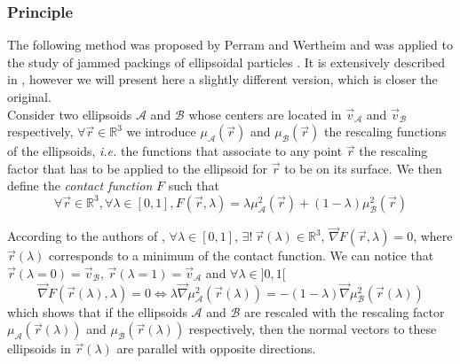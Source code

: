\documentclass[class=report, float=false, crop=false]{standalone}
\begin{document}
\subsubsection{Principle}

The following method was proposed by Perram and Wertheim \cite{perram1985statistical} and was applied to the study of jammed packings of ellipsoidal particles \cite{donev2007underconstrained}. It is extensively described in \cite{donev}, however we will present here a slightly different version, which is closer the original.\\

Consider two ellipsoids $\mathcal{A}$ and $\mathcal{B}$ whose centers are located in $\vec{v}_{\mathcal{A}}$ and $\vec{v}_{\mathcal{B}}$ respectively, $\forall \vec{r} \in \mathbb{R}^3$ we introduce $\mu_{\mathcal{A}}(\vec{r})$ and $\mu_{\mathcal{B}}(\vec{r})$ the rescaling functions of the ellipsoids, \textit{i.e.} the functions that associate to any point $\vec{r}$ the rescaling factor that has to be applied to the ellipsoid for $\vec{r}$ to be on its surface. We then define the \textit{contact function} $F$ such that
\begin{equation}
\forall \vec{r} \in \mathbb{R}^3, \forall \lambda \in [0,1], F(\vec{r},\lambda) = \lambda\mu_{\mathcal{A}}^2(\vec{r}) + (1-\lambda)\mu_{\mathcal{B}}^2(\vec{r})
\label{contact_function}
\end{equation}

According to the authors of \cite{perram1985statistical}, $\forall \lambda \in [0,1]$, $\exists!~ \vec{r}(\lambda) \in \mathbb{R}^3$, $\vec{\nabla}F(\vec{r},\lambda) = 0$, where $\vec{r}(\lambda)$ corresponds to a minimum of the contact function. We can notice that $\vec{r}(\lambda = 0) = \vec{v}_{\mathcal{B}}$, $\vec{r}(\lambda = 1) = \vec{v}_{\mathcal{A}}$ and $\forall \lambda \in ]0,1[$
\begin{equation}
\vec{\nabla}F(\vec{r}(\lambda),\lambda) = 0 \Leftrightarrow \lambda \vec{\nabla}\mu_{\mathcal{A}}^2(\vec{r}(\lambda)) = - (1 - \lambda)  \vec{\nabla}\mu_{\mathcal{B}}^2(\vec{r}(\lambda))
\label{der_contact_function}
\end{equation}
which shows that if the ellipsoids $\mathcal{A}$ and $\mathcal{B}$ are rescaled with the rescaling factor $\mu_{\mathcal{A}}(\vec{r}(\lambda))$ and $\mu_{\mathcal{B}}(\vec{r}(\lambda))$ respectively, then the normal vectors to these ellipsoids in $\vec{r}(\lambda)$ are parallel with opposite directions.\\
\end{document}
